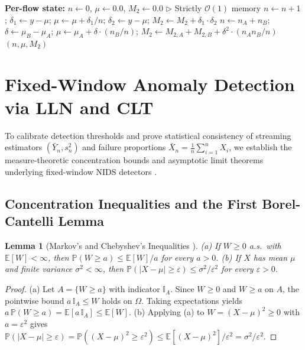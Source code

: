 \documentclass[oneside,noexaminfo,english]{sapthesis}
\numberwithin{equation}{section}
\numberwithin{figure}{section}
\numberwithin{table}{section}
\theoremstyle{compactplain}
\newtheorem{lemma}[theorem]{Lemma}
\theoremstyle{compactdef}
\theoremstyle{compactrem}
\newcommand{\E}{\mathbb{E}}
\newcommand{\Prob}{\mathbb{P}}
\begin{document}
\begin{algorithm}[!htbp]
\caption{Streaming Flow Profiler via Welford's Update and Chan's Parallel Merge}
\label{alg:welford}
\begin{algorithmic}[1]
\small
\State \textbf{Per-flow state:} $n \gets 0$, $\mu \gets 0.0$, $M_2 \gets 0.0$ \hfill $\triangleright$ Strictly $\mathcal{O}(1)$ memory
    \State $n \gets n + 1$; \quad $\delta_1 \gets y - \mu$; \quad $\mu \gets \mu + \delta_1 / n$; \quad $\delta_2 \gets y - \mu$; \quad $M_2 \gets M_2 + \delta_1 \cdot \delta_2$
\EndProcedure
{}
    \State $n \gets n_A + n_B$; \quad $\delta \gets \mu_B - \mu_A$; \quad $\mu \gets \mu_A + \delta \cdot (n_B / n)$; \quad $M_2 \gets M_{2,A} + M_{2,B} + \delta^2 \cdot (n_A n_B / n)$
    \State \Return $(n, \mu, M_2)$
\EndFunction
\end{algorithmic}
\end{algorithm}

\section{Fixed-Window Anomaly Detection via LLN and CLT}
\label{sec:lln_clt}

To calibrate detection thresholds and prove statistical consistency of streaming estimators $(\bar{Y}_n, s_n^2)$ and failure proportions $\bar{X}_n = \frac{1}{n}\sum_{i=1}^n X_i$, we establish the measure-theoretic concentration bounds and asymptotic limit theorems underlying fixed-window NIDS detectors \cite{billingsley1995}.

\subsection{Concentration Inequalities and the First Borel-Cantelli Lemma}

\begin{lemma}[Markov's and Chebyshev's Inequalities \cite{billingsley1995}]
\label{lem:markov_chebyshev}
(a) If $W \ge 0$ a.s.\ with $\E[W] < \infty$, then $\Prob(W \ge a) \le \E[W]/a$ for every $a > 0$. (b) If $X$ has mean $\mu$ and finite variance $\sigma^2 < \infty$, then $\Prob(|X - \mu| \ge \varepsilon) \le \sigma^2 / \varepsilon^2$ for every $\varepsilon > 0$.
\end{lemma}
\begin{proof}
(a) Let $A = \{W \ge a\}$ with indicator $\mathbb{I}_A$. Since $W \ge 0$ and $W \ge a$ on $A$, the pointwise bound $a\,\mathbb{I}_A \le W$ holds on $\Omega$. Taking expectations yields $a\,\Prob(W \ge a) = \E[a\,\mathbb{I}_A] \le \E[W]$.
(b) Applying (a) to $W = (X - \mu)^2 \ge 0$ with $a = \varepsilon^2$ gives $\Prob(|X-\mu| \ge \varepsilon) = \Prob((X-\mu)^2 \ge \varepsilon^2) \le \E[(X-\mu)^2]/\varepsilon^2 = \sigma^2/\varepsilon^2$.
\end{proof}
\end{document}
